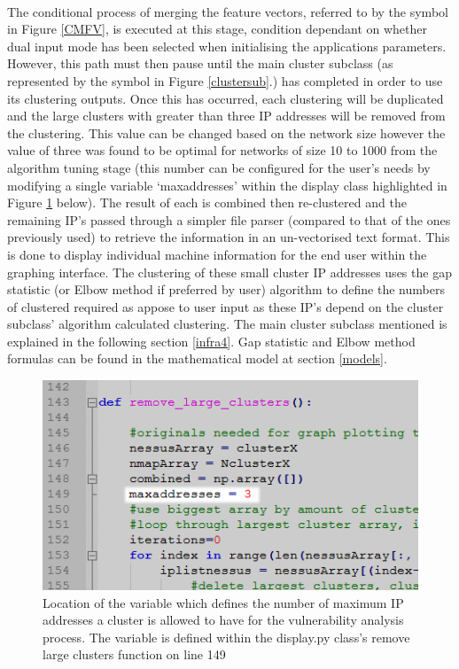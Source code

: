 \paragraph{}The conditional process of merging the feature vectors, referred to by the symbol in Figure \ref{CMFV}, is executed at this stage, condition dependant on whether dual input mode has been selected when initialising the applications parameters. However, this path must then pause until the main cluster subclass (as represented by the symbol in Figure \ref{clustersub}.) has completed in order to use its clustering outputs. Once this has occurred, each clustering will be duplicated and the large clusters with greater than three IP addresses will be removed from the clustering. This value can be changed based on the network size however the value of three was found to be optimal for networks of size 10 to 1000 from the algorithm tuning stage (this number can be configured for the user's needs by modifying a single variable ‘maxaddresses' within the display class highlighted in Figure \ref{ipno} below). The result of each is combined then re-clustered and the remaining IP's passed through a simpler file parser (compared to that of the ones previously used) to retrieve the information in an un-vectorised text format. This is done to display individual machine information for the end user within the graphing interface. The clustering of these small cluster IP addresses uses the gap statistic (or Elbow method if preferred by user) algorithm to define the numbers of clustered required as appose to user input as these IP's depend on the cluster subclass' algorithm calculated clustering. The main cluster subclass mentioned is explained in the following section \ref{infra4}. Gap statistic and Elbow method formulas can be found in the mathematical model at section \ref{models}.

\begin{figure}[!h]
\centering
\includegraphics{./Figures/ipno.png}
\caption{Location of the variable which defines the number of maximum IP addresses a cluster is allowed to have for the vulnerability analysis process. The variable is defined within the display.py class's remove large clusters function on line 149}
\label{ipno}
\end{figure}


